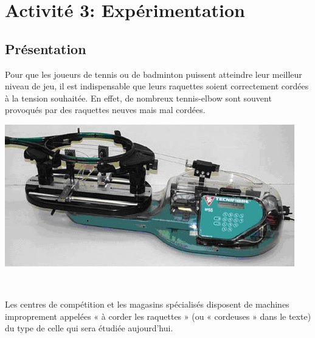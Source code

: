 \cleardoublepage

\section{Activité 3: Expérimentation}

\subsection{Présentation}

\begin{minipage}{0.55\linewidth}
Pour que les joueurs de tennis ou de badminton puissent atteindre leur meilleur niveau de jeu, il est indispensable que leurs raquettes soient correctement cordées à la tension souhaitée. En effet, de nombreux tennis-elbow sont souvent provoqués par des raquettes neuves mais mal cordées.
\end{minipage}\hfill
\begin{minipage}{0.4\linewidth}
 \centering\includegraphics[width=0.7\linewidth]{img/cordeuse.png}
\end{minipage}

~\

Les centres de compétition et les magasins spécialisés disposent de machines improprement appelées « à corder les raquettes » (ou « cordeuses » dans le texte) du type de celle qui sera étudiée aujourd'hui.

~\

